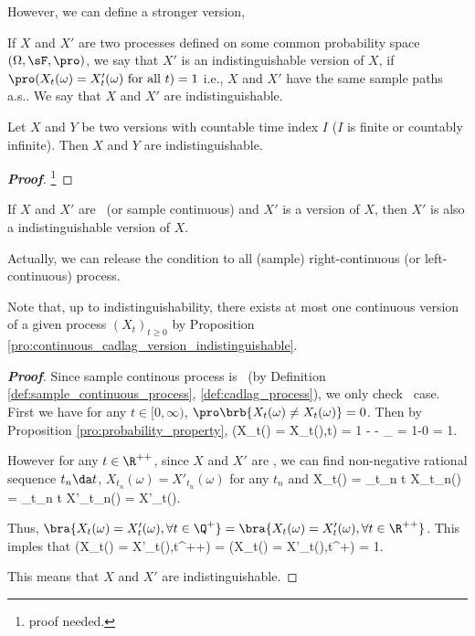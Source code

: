 However, we can define a stronger version,

\begin{definition}\label{def:indistinguishable_version_process}
If $X$ and $X'$ are two processes defined on some common probability space $(\Omega,\sF,\pro)$, we say that $X'$ is an indistinguishable version of $X$, if $\pro(X_t(\omega) = X'_t(\omega) \text{ for all }t) = 1$ i.e., $X$ and $X'$ have the same sample paths a.s.. We say that $X$ and $X'$ are indistinguishable.
\end{definition}

\begin{proposition}
Let $X$ and $Y$ be two versions with countable time index $I$ ($I$ is finite or countably infinite). Then $X$ and $Y$ are indistinguishable.
\end{proposition}

\begin{proof}[\bf Proof]
\footnote{proof needed.}
\end{proof}

\begin{proposition}\label{pro:continuous_cadlag_version_indistinguishable}
If $X$ and $X'$ are \cadlag\ (or sample continuous) and $X'$ is a version of $X$, then $X'$ is also a indistinguishable version of $X$.
\end{proposition}

\begin{remark}
Actually, we can release the condition to all (sample) right-continuous (or left-continuous) process.

Note that, up to indistinguishability, there exists at most one continuous version of a given process $(X_t)_{t \geq 0}$ by Proposition \ref{pro:continuous_cadlag_version_indistinguishable}.
\end{remark}

\begin{proof}[\bf Proof]
Since sample continous process is \cadlag\ (by Definition \ref{def:sample_continuous_process}, \ref{def:cadlag_process}), we only check \cadlag\ case. First we have for any $t\in [0,\infty)$, $\pro\brb{X_t(\omega) \neq
X_t(\omega)} = 0$. Then by Proposition \ref{pro:probability_property}, \be \pro(X_t(\omega) = X_t(\omega),\forall t\in \Q) = 1 - \pro{}  - _{} = 1-0 = 1. \ee

However for any $t\in \R^{++}$, since $X$ and $X'$ are \cadlag, we can find non-negative rational sequence $t_n \da t$, $X_{t_n}(\omega) = X'_{t_n}(\omega)$ for any $t_n$ and
\be
X_t(\omega) = \lim_{t_n \da t} X_{t_n}(\omega) = \lim_{t_n \da t} X'_{t_n}(\omega) = X'_t(\omega).
\ee

Thus, $\bra{X_t(\omega) = X'_t(\omega),\forall t\in \Q^+} = \bra{X_t(\omega) = X'_t(\omega),\forall t\in \R^{++}}$. This imples that
\be
\pro(X_t(\omega) = X'_t(\omega),\forall t\in \R^{++})  = \pro(X_t(\omega) = X'_t(\omega),\forall t\in \Q^+) = 1.
\ee

This means that $X$ and $X'$ are indistinguishable.
\end{proof}

